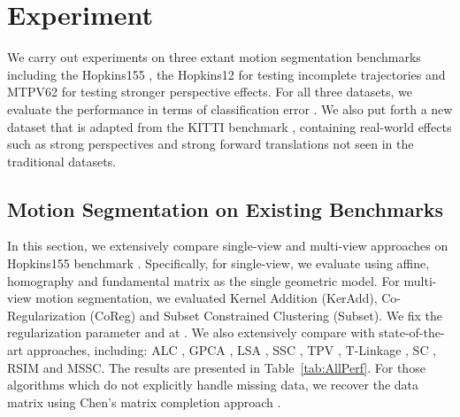 \documentclass[10pt,twocolumn,letterpaper]{article}
\begin{document}
\vspace{-0.2cm}
\section{Experiment}

We carry out experiments on three extant motion segmentation benchmarks including the Hopkins155 \cite{Tron2007}, the Hopkins12 \cite{Rao2010} for testing incomplete trajectories and MTPV62 \cite{Li2013} for testing stronger perspective effects. For all three datasets, we evaluate the performance in terms of classification error \cite{Tron2007}. We also put forth a new dataset that is adapted from the KITTI benchmark \cite{Geiger2013IJRR}, containing real-world effects such as strong perspectives and strong forward translations not seen in the traditional datasets.









\subsection{Motion Segmentation on Existing Benchmarks}

In this section, we extensively compare single-view and multi-view approaches on Hopkins155 benchmark \cite{Tron2007}. Specifically, for single-view, we evaluate using affine, homography and fundamental matrix as the single geometric model. For multi-view motion segmentation, we evaluated Kernel Addition (KerAdd), Co-Regularization (CoReg) \cite{Kumar2011} and {Subset Constrained Clustering (Subset)}. We fix the regularization parameter  and  at . 
We also extensively compare with state-of-the-art approaches, including:  ALC \cite{Rao2010}, GPCA \cite{Vidal2008}, LSA \cite{Yan2006}, SSC \cite{Elhamifar2013}, TPV \cite{Li2013}, T-Linkage \cite{Magri2014}, SC \cite{Li2015}, RSIM \cite{Ji2016} and MSSC\cite{Lai2017}. The results are presented in Table~\ref{tab:AllPerf}. For those algorithms which do not explicitly handle missing data, we recover the data matrix using Chen's matrix completion approach \cite{Chen2008}.
\end{document}
